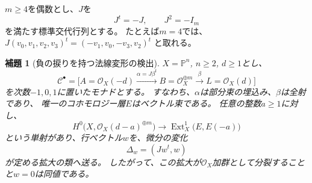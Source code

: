 \documentclass[a4paper,11pt]{ltjsarticle}
\numberwithin{equation}{section}
\theoremstyle{plain}
\newtheorem{lemma}[theorem]{補題}
\theoremstyle{definition}
\theoremstyle{remark}
\begin{document}
$m\geq4$を偶数とし、$J$を
\[
 J^t=-J,\qquad J^2=-I_m
\]
を満たす標準交代行列とする。
たとえば$m=4$では、
$J(v_0,v_1,v_2,v_3)^t=(-v_1,v_0,-v_3,v_2)^t$
と取れる。

\begin{lemma}[負の捩りを持つ法線変形の検出]
\label{lem:symplectic-negative-injection}
$X=\mathbb P^n$, $n\geq2$, $d\geq1$とし、
\begin{equation}
\label{eq:rank-one-end-monad}
 \mathcal C^\bullet=
 \bigl[
 A=\mathcal O_X(-d)
 \xrightarrow{\alpha=J\beta^t}
 B=\mathcal O_X^{\oplus m}
 \xrightarrow{\beta}
 L=\mathcal O_X(d)
 \bigr]
\end{equation}
を次数$-1,0,1$に置いたモナドとする。
すなわち、$\alpha$は部分束の埋込み、$\beta$は全射であり、
唯一のコホモロジー層$E$はベクトル束である。
任意の整数$a\geq1$に対し、
\begin{equation}
\label{eq:negative-monad-injection}
 H^0\bigl(X,\mathcal O_X(d-a)^{\oplus m}\bigr)
 \longrightarrow
 \operatorname{Ext}^1_X\bigl(E,E(-a)\bigr)
\end{equation}
という単射があり、行ベクトル$w$を、微分の変化
\[
 \Delta_w=(Jw^t,w)
\]
が定める拡大の類へ送る。
したがって、この拡大が$\mathcal O_X$加群として分裂することと$w=0$は同値である。
\end{lemma}
\end{document}
